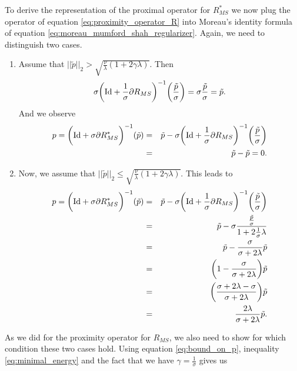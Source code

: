         To derive the representation of the proximal operator for $R_{MS}^{\ast}$ we now plug the operator of equation \ref{eq:proximity_operator_R} into Moreau's identity formula of equation \ref{eq:moreau_mumford_shah_regularizer}. Again, we need to distinguish two cases.
        \begin{enumerate}
            \item Assume that $||\tilde{p}||_{2} > \sqrt{\frac{\nu}{\lambda}(1 + 2\gamma\lambda)}$. Then
                $$
                    \sigma\bigg( \textnormal{Id} + \frac{1}{\sigma} \partial R_{MS} \bigg)^{-1} \bigg(\frac{\tilde{p}}{\sigma} \bigg) = \sigma \frac{\tilde{p}}{\sigma} = \tilde{p}.
                $$
            And we observe
                \begin{eqnarray}
                    p = \bigg( \textnormal{Id} + \sigma \partial R_{MS}^{\ast} \bigg)^{-1}(\tilde{p}) &=& \tilde{p} - \sigma \bigg( \textnormal{Id} + \frac{1}{\sigma} \partial R_{MS} \bigg)^{-1} \bigg(\frac{\tilde{p}}{\sigma} \bigg) \notag \\
                    &=& \tilde{p} - \tilde{p} = 0. \notag
                \end{eqnarray}
            \item Now, we assume that $||\tilde{p}||_{2} \le \sqrt{\frac{\nu}{\lambda}(1 + 2\gamma\lambda)}$. This leads to
                \begin{eqnarray}
                    p = \bigg( \textnormal{Id} + \sigma \partial R_{MS}^{\ast} \bigg)^{-1}(\tilde{p}) &=& \tilde{p} - \sigma \bigg( \textnormal{Id} + \frac{1}{\sigma} \partial R_{MS} \bigg)^{-1} \bigg(\frac{\tilde{p}}{\sigma} \bigg) \notag \\
                    &=& \tilde{p} - \sigma \frac{\frac{\tilde{p}}{\sigma}}{1 + 2\frac{1}{\sigma}\lambda} \notag \\
                    &=& \tilde{p} - \frac{\sigma}{\sigma + 2\lambda}\tilde{p} \notag \\
                    &=& \bigg(1 - \frac{\sigma}{\sigma + 2\lambda}\bigg) \tilde{p} \notag \\
                    &=& \bigg(\frac{\sigma + 2\lambda - \sigma}{\sigma + 2\lambda}\bigg) \tilde{p} \notag \\
                    &=& \frac{2\lambda}{\sigma + 2\lambda} \tilde{p}. \label{eq:proximity_operator_R_star}
                \end{eqnarray}
        \end{enumerate}
        As we did for the proximity operator for $R_{MS}$, we also need to show for which condition these two cases hold. Using equation \ref{eq:bound_on_p}, inequality \ref{eq:minimal_energy} and the fact that we have $\gamma = \frac{1}{\sigma}$ gives us

